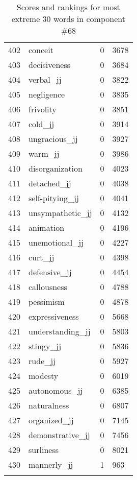 \begin{longtable}[!htbp]{| rlr@{.}l |}
    402 & conceit & 0 & 3678 \\
    403 & decisiveness & 0 & 3684 \\
    404 & verbal\_jj & 0 & 3822 \\
    405 & negligence & 0 & 3835 \\
    406 & frivolity & 0 & 3851 \\
    407 & cold\_jj & 0 & 3914 \\
    408 & ungracious\_jj & 0 & 3927 \\
    409 & warm\_jj & 0 & 3986 \\
    410 & disorganization & 0 & 4023 \\
    411 & detached\_jj & 0 & 4038 \\
    412 & self-pitying\_jj & 0 & 4041 \\
    413 & unsympathetic\_jj & 0 & 4132 \\
    414 & animation & 0 & 4196 \\
    415 & unemotional\_jj & 0 & 4227 \\
    416 & curt\_jj & 0 & 4398 \\
    417 & defensive\_jj & 0 & 4454 \\
    418 & callousness & 0 & 4788 \\
    419 & pessimism & 0 & 4878 \\
    420 & expressiveness & 0 & 5668 \\
    421 & understanding\_jj & 0 & 5803 \\
    422 & stingy\_jj & 0 & 5836 \\
    423 & rude\_jj & 0 & 5927 \\
    424 & modesty & 0 & 6019 \\
    425 & autonomous\_jj & 0 & 6385 \\
    426 & naturalness & 0 & 6807 \\
    427 & organized\_jj & 0 & 7145 \\
    428 & demonstrative\_jj & 0 & 7456 \\
    429 & surliness & 0 & 8021 \\
    430 & mannerly\_jj & 1 & 963 \\
    \hline
    \caption{Scores and rankings for most extreme 30 words in component \#68} \\
\end{longtable}
